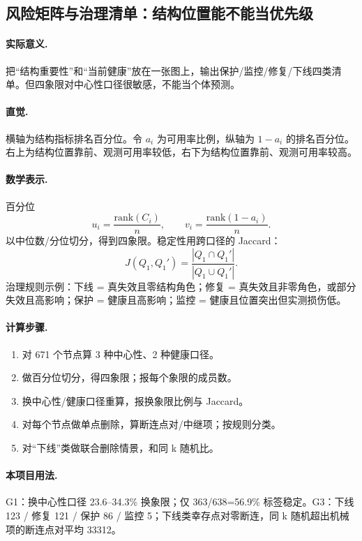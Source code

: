 \subsection{风险矩阵与治理清单：结构位置能不能当优先级}

\paragraph{实际意义.}
把“结构重要性”和“当前健康”放在一张图上，输出保护/监控/修复/下线四类清单。但四象限对中心性口径很敏感，不能当个体预测。

\paragraph{直觉.}
横轴为结构指标排名百分位。令 \(a_i\) 为可用率比例，纵轴为 \(1-a_i\) 的排名百分位。右上为结构位置靠前、观测可用率较低，右下为结构位置靠前、观测可用率较高。

\paragraph{数学表示.}
百分位
\[
u_i=\frac{\mathrm{rank}(C_i)}{n},\qquad v_i=\frac{\mathrm{rank}(1-a_i)}{n}.
\]
以中位数/分位切分，得到四象限。稳定性用跨口径的 Jaccard：
\[
J(Q_1,Q_1')=\frac{|Q_1\cap Q_1'|}{|Q_1\cup Q_1'|}.
\]
治理规则示例：下线 = 真失效且零结构角色；修复 = 真失效且非零角色，或部分失效且高影响；保护 = 健康且高影响；监控 = 健康且位置突出但实测损伤低。

\paragraph{计算步骤.}
\begin{enumerate}
  \item 对 671 个节点算 3 种中心性、2 种健康口径。
  \item 做百分位切分，得四象限；报每个象限的成员数。
  \item 换中心性/健康口径重算，报换象限比例与 Jaccard。
  \item 对每个节点做单点删除，算断连点对/中继项；按规则分类。
  \item 对“下线”类做联合删除情景，和同 k 随机比。
\end{enumerate}

\paragraph{本项目用法.}
\unit{G1}：换中心性口径 23.6--34.3\% 换象限；仅 363/638=56.9\% 标签稳定。\unit{G3}：下线 123 / 修复 121 / 保护 86 / 监控 5；下线类幸存点对零断连，同 k 随机超出机械项的断连点对平均 33312。


